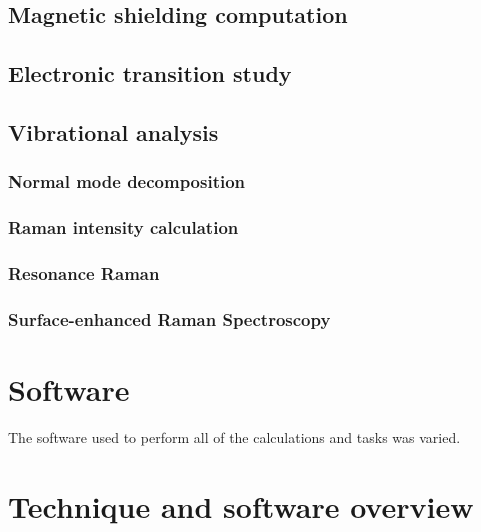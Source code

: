 \subsection{Magnetic shielding computation}
\blindtext

\subsection{Electronic transition study}
\blindtext

\subsection{Vibrational analysis}
\blindtext

\subsubsection{Normal mode decomposition}
\blindtext

\subsubsection{Raman intensity calculation}
\blindtext

\subsubsection{Resonance Raman}
\blindtext

\subsubsection{Surface-enhanced Raman Spectroscopy}
\blindtext

\section{Software}

The software used to perform all of the calculations and tasks was varied.

\section{Technique and software overview}

